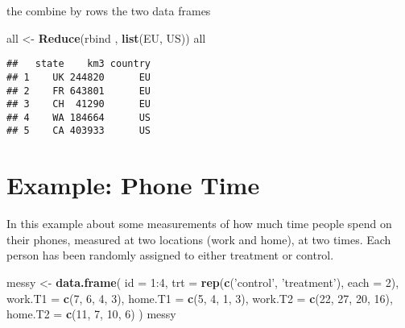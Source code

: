\documentclass[]{book}
\newenvironment{Shaded}{\begin{snugshade}}{\end{snugshade}}
\newcommand{\KeywordTok}[1]{\textcolor[rgb]{0.13,0.29,0.53}{\textbf{{#1}}}}
\newcommand{\DataTypeTok}[1]{\textcolor[rgb]{0.13,0.29,0.53}{{#1}}}
\newcommand{\DecValTok}[1]{\textcolor[rgb]{0.00,0.00,0.81}{{#1}}}
\newcommand{\StringTok}[1]{\textcolor[rgb]{0.31,0.60,0.02}{{#1}}}
\newcommand{\NormalTok}[1]{{#1}}
\begin{document}
the combine by rows the two data frames

\begin{Shaded}
\begin{Highlighting}[]
\NormalTok{all <-}\StringTok{ }\KeywordTok{Reduce}\NormalTok{(rbind , }\KeywordTok{list}\NormalTok{(EU, US))}
\NormalTok{all}
\end{Highlighting}
\end{Shaded}

\begin{verbatim}
##   state    km3 country
## 1    UK 244820      EU
## 2    FR 643801      EU
## 3    CH  41290      EU
## 4    WA 184664      US
## 5    CA 403933      US
\end{verbatim}

\section{Example: Phone Time}\label{example-phone-time}

In this example about some measurements of how much time people spend on
their phones, measured at two locations (work and home), at two times.
Each person has been randomly assigned to either treatment or control.

\begin{Shaded}
\begin{Highlighting}[]
\NormalTok{messy <-}\StringTok{ }\KeywordTok{data.frame}\NormalTok{(}
  \DataTypeTok{id =} \DecValTok{1}\NormalTok{:}\DecValTok{4}\NormalTok{,}
  \DataTypeTok{trt =} \KeywordTok{rep}\NormalTok{(}\KeywordTok{c}\NormalTok{(}\StringTok{'control'}\NormalTok{, }\StringTok{'treatment'}\NormalTok{), }\DataTypeTok{each =} \DecValTok{2}\NormalTok{),}
  \DataTypeTok{work.T1 =} \KeywordTok{c}\NormalTok{(}\DecValTok{7}\NormalTok{, }\DecValTok{6}\NormalTok{, }\DecValTok{4}\NormalTok{, }\DecValTok{3}\NormalTok{),}
  \DataTypeTok{home.T1 =} \KeywordTok{c}\NormalTok{(}\DecValTok{5}\NormalTok{, }\DecValTok{4}\NormalTok{, }\DecValTok{1}\NormalTok{, }\DecValTok{3}\NormalTok{),}
  \DataTypeTok{work.T2 =} \KeywordTok{c}\NormalTok{(}\DecValTok{22}\NormalTok{, }\DecValTok{27}\NormalTok{, }\DecValTok{20}\NormalTok{, }\DecValTok{16}\NormalTok{),}
  \DataTypeTok{home.T2 =} \KeywordTok{c}\NormalTok{(}\DecValTok{11}\NormalTok{, }\DecValTok{7}\NormalTok{, }\DecValTok{10}\NormalTok{, }\DecValTok{6}\NormalTok{)}
\NormalTok{)}
\NormalTok{messy}
\end{Highlighting}
\end{Shaded}
\end{document}
